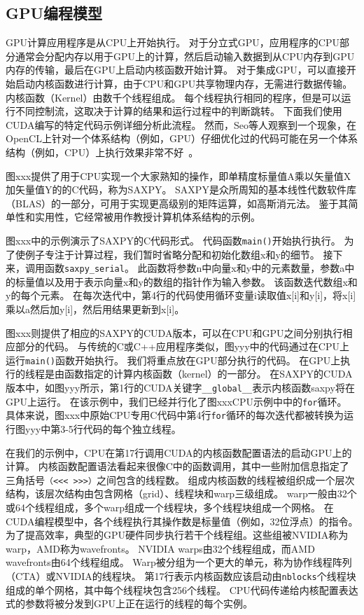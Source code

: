 

\subsection{GPU编程模型}

GPU计算应用程序是从CPU上开始执行。
对于分立式GPU，应用程序的CPU部分通常会分配内存以用于GPU上的计算，然后启动输入数据到从CPU内存到GPU内存的传输，最后在GPU上启动内核函数开始计算。
对于集成GPU，可以直接开始启动内核函数进行计算，由于CPU和GPU共享物理内存，无需进行数据传输。
内核函数（Kernel）由数千个线程组成。
每个线程执行相同的程序，但是可以运行不同控制流，这取决于计算的结果和运行过程中的判断跳转。
下面我们使用CUDA编写的特定代码示例详细分析此流程。
然而，Seo等人观察到一个现象，在OpenCL上针对一个体系结构（例如，GPU）仔细优化过的代码可能在另一个体系结构（例如，CPU）上执行效果非常不好~\cite{seo2011performance}。

图xxx提供了用于CPU实现一个大家熟知的操作，即单精度标量值A乘以矢量值X加矢量值Y的的C代码，称为SAXPY。 
SAXPY是众所周知的基本线性代数软件库（BLAS）的一部分，可用于实现更高级别的矩阵运算，如高斯消元法。 
鉴于其简单性和实用性，它经常被用作教授计算机体系结构的示例。

图xxx中的示例演示了SAXPY的C代码形式。
代码函数\texttt{main()}开始执行执行。 为了使例子专注于计算过程，我们暂时省略分配和初始化数组x和y的细节。 
接下来，调用函数\texttt{saxpy_serial}。 
此函数将参数n中向量x和y中的元素数量，参数a中的标量值以及用于表示向量x和y的数组的指针作为输入参数。 
该函数迭代数组x和y的每个元素。 
在每次迭代中，第4行的代码使用循环变量i读取值x[i]和y[i]，将x[i]乘以a然后加y[i]，然后用结果更新到x[i]。
 
图xxx则提供了相应的SAXPY的CUDA版本，可以在CPU和GPU之间分别执行相应部分的代码。
与传统的C或C++应用程序类似，图yyy中的代码通过在CPU上运行\texttt{main()}函数开始执行。 
我们将重点放在GPU部分执行的代码。
在GPU上执行的线程是由函数指定的计算内核函数（kernel）的一部分。 
在SAXPY的CUDA版本中，如图yyy所示，第1行的CUDA关键字\texttt{__global__}表示内核函数saxpy将在GPU上运行。 
在该示例中，我们已经并行化了图xxxCPU示例中中的\texttt{for}循环。 
具体来说，图xxx中原始CPU专用C代码中第4行\texttt{for}循环的每次迭代都被转换为运行图yyy中第3-5行代码的每个独立线程。

在我们的示例中，CPU在第17行调用CUDA的内核函数配置语法的启动GPU上的计算。
内核函数配置语法看起来很像C中的函数调用，其中一些附加信息指定了三角括号\texttt{（<<< >>>）}之间包含的线程数。
组成内核函数的线程被组织成一个层次结构，该层次结构由包含网格（grid）、线程块和warp三级组成。
warp一般由32个或64个线程组成，多个warp组成一个线程块，多个线程块组成一个网格。
在CUDA编程模型中，各个线程执行其操作数是标量值（例如，32位浮点）的指令。
为了提高效率，典型的GPU硬件同步执行若干个线程组。这些组被NVIDIA称为warp，AMD称为wavefronts。 NVIDIA warps由32个线程组成，而AMD wavefronts由64个线程组成。 
Warp被分组为一个更大的单元，称为协作线程阵列（CTA）或NVIDIA的线程块。
第17行表示内核函数应该启动由\texttt{nblocks}个线程块组成的单个网格，其中每个线程块包含256个线程。
CPU代码传递给内核配置表达式的参数将被分发到GPU上正在运行的线程的每个实例。

